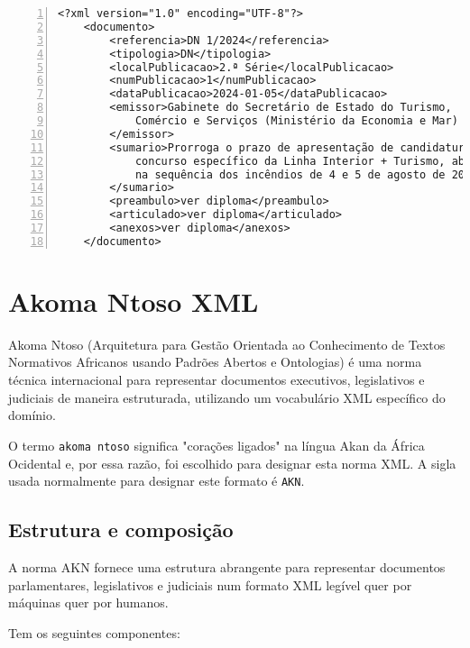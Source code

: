 \begin{Verbatim}[frame=single, numbers=left, fontsize=\small, commandchars=\\\{\}]
<?xml version="1.0" encoding="UTF-8"?>
    <documento>
        <referencia>DN 1/2024</referencia>
        <tipologia>DN</tipologia>
        <localPublicacao>2.ª Série</localPublicacao>
        <numPublicacao>1</numPublicacao>
        <dataPublicacao>2024-01-05</dataPublicacao>
        <emissor>Gabinete do Secretário de Estado do Turismo, 
            Comércio e Serviços (Ministério da Economia e Mar)
        </emissor>
        <sumario>Prorroga o prazo de apresentação de candidaturas ao 
            concurso específico da Linha Interior + Turismo, aberto 
            na sequência dos incêndios de 4 e 5 de agosto de 2023
        </sumario>
        <preambulo>ver diploma</preambulo>
        <articulado>ver diploma</articulado>
        <anexos>ver diploma</anexos>
    </documento>
\end{Verbatim}


\section{Akoma Ntoso XML}

Akoma Ntoso (Arquitetura para Gestão Orientada ao Conhecimento de Textos Normativos Africanos usando Padrões Abertos e Ontologias) 
é uma norma técnica internacional para representar documentos executivos, legislativos e judiciais de maneira estruturada, 
utilizando um vocabulário XML específico do domínio.

O termo \texttt{akoma ntoso} significa "corações ligados" na língua Akan da África Ocidental e, por essa razão, foi escolhido 
para designar esta norma XML. A sigla usada normalmente para designar este formato é \texttt{AKN}.

\subsection{Estrutura e composição}

A norma AKN fornece uma estrutura abrangente para representar documentos parlamentares, legislativos e judiciais 
num formato XML legível quer por máquinas quer por humanos. 

Tem os seguintes componentes:

